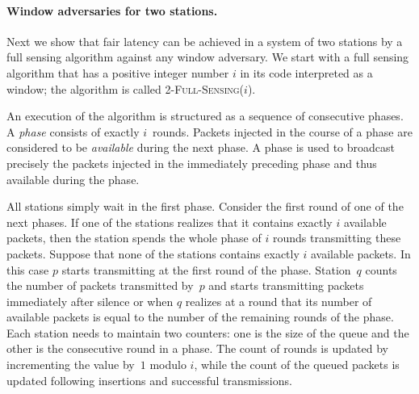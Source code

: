 \documentclass[11pt]{article}
\newcommand{\BBB}{\vspace*{-\bigskipamount}}
\newcommand{\Paragraph}[1]{\BBB\paragraph{#1}}
\begin{document}

\Paragraph{Window adversaries for two stations.}



Next we show that fair latency can be achieved in a system of two stations by a full sensing algorithm against any window adversary.
We start with a full sensing algorithm that has a positive integer number $i$ in its code  interpreted as a window; the algorithm is called \textsc{2-Full-Sensing($i$)}.

An execution of the algorithm is structured as a sequence of consecutive phases.
A \emph{phase} consists of exactly $i$~rounds.
Packets injected in the course of a phase are considered to be \emph{available} during the next phase.
A phase is used to broadcast precisely the packets injected in the immediately preceding phase and thus available during the phase.

All stations simply wait in the first phase.
Consider the first round of one of the next phases.
If one of the stations realizes that it contains exactly $i$ available packets, then the station  spends the whole phase of $i$ rounds transmitting these packets.
Suppose that none of the stations contains exactly $i$ available packets.
In this case $p$ starts transmitting at the first round of the phase.
Station~$q$ counts the number of  packets transmitted by~$p$ and starts transmitting packets immediately after silence or when $q$ realizes at a round that its number of available packets is equal to the number of the remaining rounds of the phase.
%
Each station needs to maintain two counters: one is the size of the queue and the other is the consecutive round in a phase.
The count of rounds is updated by incrementing the value by~$1$ modulo $i$, while the count of the queued packets is updated following insertions and successful transmissions.
\end{document}
